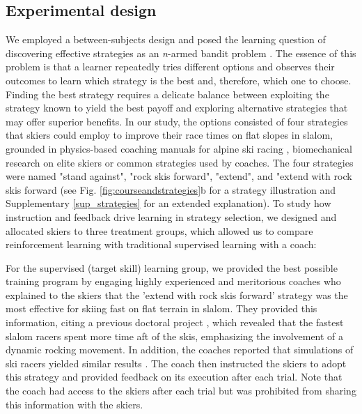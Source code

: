 \documentclass[pdflatex,sn-mathphys-num]{sn-jnl}%
\theoremstyle{thmstyleone}%
\theoremstyle{thmstyletwo}%
\theoremstyle{thmstylethree}%
\begin{document}
\subsection{Experimental design}
We employed a between-subjects design and posed the learning question of discovering effective strategies as an \textit{n}-armed bandit problem \cite{sutton_reinforcement_2018}. The essence of this problem is that a learner repeatedly tries different options and observes their outcomes to learn which strategy is the best and, therefore, which one to choose. Finding the best strategy requires a delicate balance between exploiting the strategy known to yield the best payoff and exploring alternative strategies that may offer superior benefits. In our study, the options consisted of four strategies that skiers could employ to improve their race times on flat slopes in slalom, grounded in physics-based coaching manuals for alpine ski racing \cite{lemaster_skiers_1999, lemaster_ultimate_2010, lind_physics_2013}, biomechanical research on elite skiers \cite{reid_kinematic_2010, reid_alpine_2020, magelssen_is_2022}  or common strategies used by coaches.  The four strategies were named "stand against", "rock skis forward", "extend", and "extend with rock skis forward (see Fig. \ref{fig:courseandstrategies}b for a strategy illustration and Supplementary \ref{sup_strategies} for an extended explanation). To study how instruction and feedback drive learning in strategy selection, we designed and allocated skiers to three treatment groups, which allowed us to compare reinforcement learning with traditional supervised learning with a coach: 

For the supervised (target skill) learning group, we provided the best possible training program by engaging highly experienced and meritorious coaches who explained to the skiers that the 'extend with rock skis forward' strategy was the most effective for skiing fast on flat terrain in slalom. They provided this information, citing a previous doctoral project \cite{reid_kinematic_2010}, which revealed that the fastest slalom racers spent more time aft of the skis, emphasizing the involvement of a dynamic rocking movement. In addition, the coaches reported that simulations of ski racers yielded similar results \cite{mote_accelerations_1983, lind_physics_2013}. The coach then instructed the skiers to adopt this strategy and provided feedback on its execution after each trial. Note that the coach had access to the skiers after each trial but was prohibited from sharing this information with the skiers.
\end{document}
